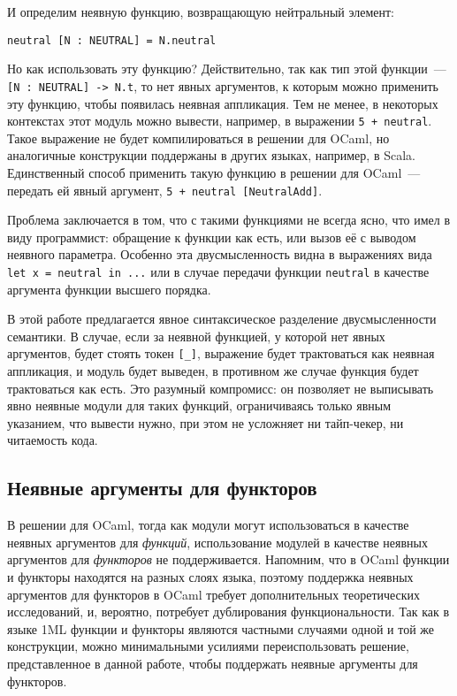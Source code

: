 \documentclass[../diploma.tex]{subfiles}
\begin{document}
И определим неявную функцию, возвращающую нейтральный элемент:

\begin{verbatim}
neutral [N : NEUTRAL] = N.neutral
\end{verbatim}

Но как использовать эту функцию? Действительно, так как тип этой функции~--- \texttt{[N : NEUTRAL] -> N.t}, то нет явных аргументов, к которым можно применить эту функцию, чтобы появилась неявная аппликация. Тем не менее, в некоторых контекстах этот модуль можно вывести, например, в выражении \texttt{5 + neutral}. Такое выражение не будет компилироваться в решении для OCaml, но аналогичные конструкции поддержаны в других языках, например, в Scala. Единственный способ применить такую функцию в решении для OCaml~--- передать ей явный аргумент, \texttt{5 + neutral [NeutralAdd]}.

Проблема заключается в том, что с такими функциями не всегда ясно, что имел в виду программист: обращение к функции как есть, или вызов её с выводом неявного параметра. Особенно эта двусмысленность видна в выражениях вида \texttt{let x = neutral in ...} или в случае передачи функции \texttt{neutral} в качестве аргумента функции высшего порядка. 

В этой работе предлагается явное синтаксическое разделение двусмысленности семантики. В случае, если за неявной функцией, у которой нет явных аргументов, будет стоять токен \texttt{[_]}, выражение будет трактоваться как неявная аппликация, и модуль будет выведен, в противном же случае функция будет трактоваться как есть. Это разумный компромисс: он позволяет не выписывать явно неявные модули для таких функций, ограничиваясь только явным указанием, что вывести нужно, при этом не усложняет ни тайп-чекер, ни читаемость кода.

\subsection{Неявные аргументы для функторов}

В решении для OCaml, тогда как модули могут использоваться в качестве неявных аргументов для \textit{функций}, использование модулей в качестве неявных аргументов для \textit{функторов} не поддерживается. Напомним, что в OCaml функции и функторы находятся на разных слоях языка, поэтому поддержка неявных аргументов для функторов в OCaml требует дополнительных теоретических исследований, и, вероятно, потребует дублирования функциональности. Так как в языке 1ML функции и функторы являются частными случаями одной и той же конструкции, можно минимальными усилиями переиспользовать решение, представленное в данной работе, чтобы поддержать неявные аргументы для функторов.
\end{document}
